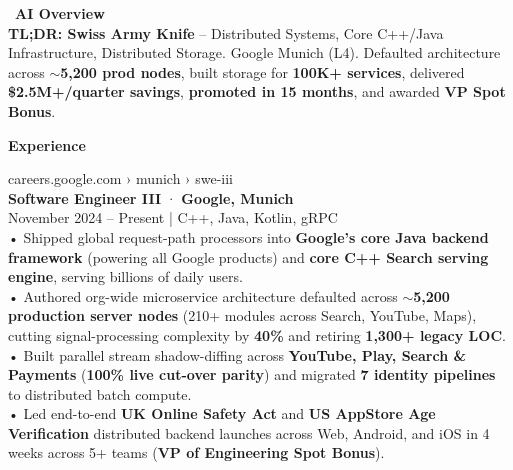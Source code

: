 \documentclass[letterpaper,10pt]{article}
\begin{document}
\begin{minipage}[t]{0.58\textwidth}

\colorbox{AIOverviewBg}{%
\begin{minipage}[t]{0.96\linewidth}
\vspace{4pt}
{\color{AIPurple}\footnotesize\faRobot}~{\selectfont\footnotesize\bfseries\color{TextBlack}AI Overview}\\[3pt]
{\selectfont\small\color{TextBlack}%
\textbf{TL;DR: Swiss Army Knife} -- Distributed Systems, Core C++/Java Infrastructure, Distributed Storage. Google Munich (L4). Defaulted architecture across \textbf{$\sim$5,200 prod nodes}, built storage for \textbf{100K+ services}, delivered \textbf{\$2.5M+/quarter savings}, \textbf{promoted in 15 months}, and awarded \textbf{VP Spot Bonus}.%
}
\vspace{4pt}
\end{minipage}%
}

\vspace{6pt}

{\selectfont\normalsize\bfseries\color{TextBlack}Experience}
\vspace{4pt}

{\selectfont\footnotesize\color{UrlGreen}careers.google.com › munich › swe-iii}\\[-2pt]
{\selectfont\color{LinkBlue}\normalsize\bfseries Software Engineer III} {\normalsize· \textbf{Google, Munich}}\\[1pt]
{\selectfont\footnotesize\color{SubtleGray}November 2024 -- Present | C++, Java, Kotlin, gRPC}\\[2pt]
{\selectfont\small\color{TextBlack}%
• Shipped global request-path processors into \textbf{Google's core Java backend framework} (powering all Google products) and \textbf{core C++ Search serving engine}, serving billions of daily users.\\[1pt]
• Authored org-wide microservice architecture defaulted across \textbf{$\sim$5,200 production server nodes} (210+ modules across Search, YouTube, Maps), cutting signal-processing complexity by \textbf{40\%} and retiring \textbf{1,300+ legacy LOC}.\\[1pt]
• Built parallel stream shadow-diffing across \textbf{YouTube, Play, Search \& Payments} (\textbf{100\% live cut-over parity}) and migrated \textbf{7 identity pipelines} to distributed batch compute.\\[1pt]
• Led end-to-end \textbf{UK Online Safety Act} and \textbf{US AppStore Age Verification} distributed backend launches across Web, Android, and iOS in 4 weeks across 5+ teams (\textbf{VP of Engineering Spot Bonus}).%
}


\end{minipage}
\end{document}
